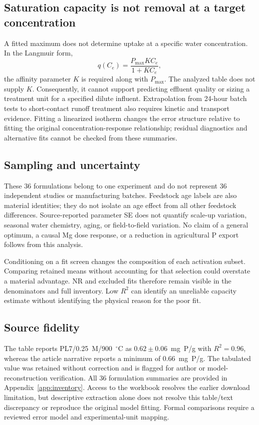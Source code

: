 \documentclass[11pt,letterpaper]{article}
\begin{document}
\subsection{Saturation capacity is not removal at a target concentration}
A fitted maximum does not determine uptake at a specific water concentration. In the Langmuir form,
\begin{equation}
q(C_e)=\frac{P_{\max}K C_e}{1+K C_e},
\end{equation}
the affinity parameter $K$ is required along with $P_{\max}$. The analyzed table does not supply $K$. Consequently, it cannot support predicting effluent quality or sizing a treatment unit for a specified dilute influent. Extrapolation from 24-hour batch tests to short-contact runoff treatment also requires kinetic and transport evidence. Fitting a linearized isotherm changes the error structure relative to fitting the original concentration-response relationship; residual diagnostics and alternative fits cannot be checked from these summaries.

\subsection{Sampling and uncertainty}
These 36 formulations belong to one experiment and do not represent 36 independent studies or manufacturing batches. Feedstock age labels are also material identities; they do not isolate an age effect from all other feedstock differences. Source-reported parameter SE does not quantify scale-up variation, seasonal water chemistry, aging, or field-to-field variation. No claim of a general optimum, a causal Mg dose response, or a reduction in agricultural P export follows from this analysis.

Conditioning on a fit screen changes the composition of each activation subset. Comparing retained means without accounting for that selection could overstate a material advantage. NR and excluded fits therefore remain visible in the denominators and full inventory. Low $R^2$ can identify an unreliable capacity estimate without identifying the physical reason for the poor fit.

\subsection{Source fidelity}
The table reports PL7/0.25~M/900~$^\circ$C as $0.62\pm0.06$~mg~P/g with $R^2=0.96$, whereas the article narrative reports a minimum of 0.66~mg~P/g. The tabulated value was retained without correction and is flagged for author or model-reconstruction verification. All 36 formulation summaries are provided in Appendix~\ref{app:inventory}. Access to the workbook resolves the earlier download limitation, but descriptive extraction alone does not resolve this table/text discrepancy or reproduce the original model fitting. Formal comparisons require a reviewed error model and experimental-unit mapping.
\end{document}
